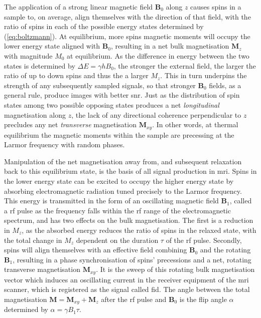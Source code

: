 The application of a strong linear magnetic field $\mathbf{B}_0$ along $z$ causes spins in a sample to, on average, align themselves with the direction of that field, with the ratio of spins in each of the possible energy states determined by (\ref{eq:boltzmann}).
At equilibrium, more spins magnetic moments will occupy the lower energy state aligned with $\mathbf{B}_0$, resulting in a net bulk magnetisation $\mathbf{M}_z$ with magnitude $M_0$ at equilibrium.
As the difference in energy between the two states is determined by $\Delta E = \gamma h B_0$, the stronger the external field, the larger the ratio of up to down spins and thus the a larger $M_z$.
This in turn underpins the strength of any subsequently sampled signals, so that stronger $\mathbf{B}_0$ fields, as a general rule, produce images with better \gls{snr}.
Just as the distribution of spin states among two possible opposing states produces a net \textit{longitudinal} magnetisation along $z$, the lack of any directional coherence perpendicular to $z$ precludes any net \textit{transverse} magnetisation $\mathbf{M}_{xy}$.
In other words, at thermal equilibrium the magnetic moments within the sample are precessing at the Larmor frequency with random phases.

Manipulation of the net magnetisation away from, and subsequent relaxation back to this equilibrium state, is the basis of all signal production in \gls{mri}.
Spins in the lower energy state can be excited to occupy the higher energy state by absorbing electromagnetic radiation tuned precisely to the Larmor frequency.
This energy is transmitted in the form of an oscillating magnetic field $\mathbf{B}_1$, called a \gls{rf} pulse as the frequency falls within the \gls{rf} range of the electromagnetic spectrum, and has two effects on the bulk magnetisation.
The first is a reduction in $M_z$, as the absorbed energy reduces the ratio of spins in the relaxed state, with the total change in $M_z$ dependent on the duration $\tau$ of the \gls{rf} pulse.
Secondly, spins will align themselves with an effective field combining $\mathbf{B}_0$ and the rotating $\mathbf{B}_1$, resulting in a phase synchronisation of spins' precessions and a net, rotating transverse magnetisation $\mathbf{M}_{xy}$.
It is the sweep of this rotating bulk magnetisation vector which induces an oscillating current in the receiver equipment of the \gls{mri} scanner, which is registered as the signal called \gls{fid}.
The angle between the total magnetisation $\mathbf{M} = \mathbf{M}_{xy} + \mathbf{M}_{z}$ after the \gls{rf} pulse and $\mathbf{B}_0$ is the flip angle $\alpha$ determined by $\alpha = \gamma B_1 \tau$.

